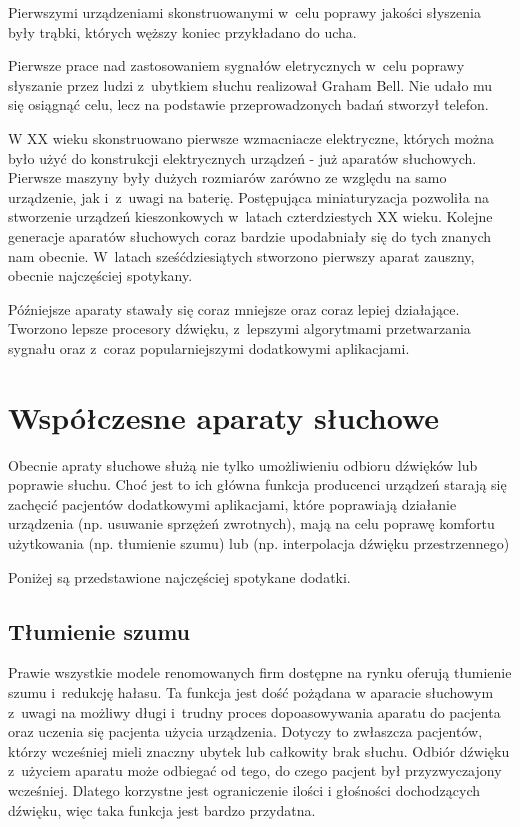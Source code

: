 \documentclass[journal]{IEEEtran}
\begin{document}
Pierwszymi urządzeniami skonstruowanymi w~celu poprawy jakości słyszenia były trąbki, których węższy koniec przykładano do ucha.

Pierwsze prace nad zastosowaniem sygnałów eletrycznych w~celu poprawy słyszanie przez ludzi z~ubytkiem słuchu realizował Graham Bell. Nie udało mu się osiągnąć celu, lecz na podstawie przeprowadzonych badań stworzył telefon.

W XX wieku skonstruowano pierwsze wzmacniacze elektryczne, których można było użyć do konstrukcji elektrycznych urządzeń - już aparatów słuchowych. Pierwsze maszyny były dużych rozmiarów zarówno ze względu na samo urządzenie, jak i~z~uwagi na baterię. Postępująca miniaturyzacja pozwoliła na stworzenie urządzeń kieszonkowych w~latach czterdziestych XX wieku. Kolejne generacje aparatów słuchowych coraz bardzie upodabniały się do tych znanych nam obecnie. W~latach sześćdziesiątych stworzono pierwszy aparat zauszny, obecnie najczęściej spotykany.

Późniejsze aparaty stawały się coraz mniejsze oraz coraz lepiej działające. Tworzono lepsze procesory dźwięku, z~lepszymi algorytmami przetwarzania sygnału oraz z~coraz popularniejszymi dodatkowymi aplikacjami.

\section{Współczesne aparaty słuchowe}

Obecnie apraty słuchowe służą nie tylko umożliwieniu odbioru dźwięków lub poprawie słuchu. Choć jest to ich główna funkcja producenci urządzeń starają się zachęcić pacjentów dodatkowymi aplikacjami, które poprawiają działanie urządzenia (np. usuwanie sprzężeń zwrotnych), mają na celu poprawę komfortu użytkowania (np. tłumienie szumu) lub (np. interpolacja dźwięku przestrzennego)

Poniżej są przedstawione najczęściej spotykane dodatki.

\subsection{Tłumienie szumu}

Prawie wszystkie modele renomowanych firm dostępne na rynku oferują tłumienie szumu i~redukcję hałasu. Ta funkcja jest dość pożądana w aparacie słuchowym z~uwagi na możliwy długi i~trudny proces dopoasowywania aparatu do pacjenta oraz uczenia się pacjenta użycia urządzenia. Dotyczy to zwłaszcza pacjentów, którzy wcześniej mieli znaczny ubytek lub całkowity brak słuchu. Odbiór dźwięku z~użyciem aparatu może odbiegać od tego, do czego pacjent był przyzwyczajony wcześniej. Dlatego korzystne jest ograniczenie ilości i głośności dochodzących dźwięku, więc taka funkcja jest bardzo przydatna.
\end{document}
